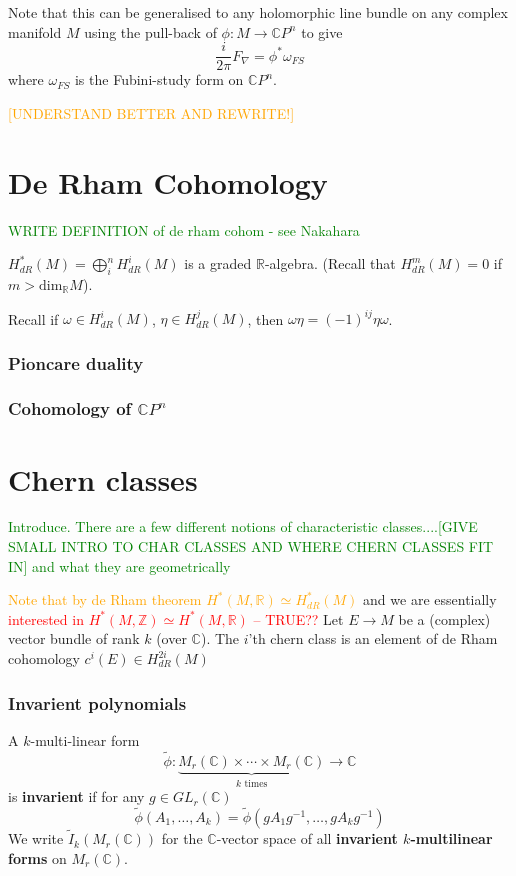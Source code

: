 \documentclass[a4paper]{article}
\theoremstyle{definition} \newtheorem*{definition}{Definition}
\theoremstyle{definition} \newtheorem*{definitions}{Definitions}
\theoremstyle{plain} \newtheorem{theorem}{Theorem}[section]
\theoremstyle{plain} \newtheorem{proposition}[theorem]{Proposition}
\theoremstyle{plain} \newtheorem{corollary}[theorem]{Corollary}
\theoremstyle{plain} \newtheorem{lemma}[theorem]{Lemma}
\theoremstyle{plain} \newtheorem{example}[theorem]{Example}
\newcommand{\checkCorrect}[1]{\textcolor{red}{#1}}
\newcommand{\understandBetter}[1]{\textcolor{orange}{#1}}
\newcommand{\finish}[1]{\textcolor{green}{#1}}
\newcommand{\defn}[1]{\textbf{#1}}
\newcommand{\realnos}{\mathbb{R}}
\newcommand{\complexnos}{\mathbb{C}}
\begin{document}
Note that this can be generalised to any holomorphic line bundle on any complex manifold $M$ using the pull-back of $\phi:M\to \complexnos P^n$ to give
$$\frac{i}{2\pi}F_\nabla = \phi^* \omega_{FS}$$
where $\omega_{FS}$ is the Fubini-study form on $\complexnos P^n$.

\understandBetter{[UNDERSTAND BETTER AND REWRITE!]}

\section{De Rham Cohomology}
\finish{WRITE DEFINITION of de rham cohom - see Nakahara}

$H^*_{dR}(M) = \bigoplus_i^n H^i_{dR}(M)$ is a graded $\realnos$-algebra. (Recall that $H^m_{dR}(M)=0$ if $m>\text{dim}_\realnos M$). 

Recall if $\omega \in H^{i}_{dR}(M)$, $\eta \in H^{j}_{dR}(M)$, then $\omega \eta = (-1)^{ij} \eta \omega$.

\subsubsection{Pioncare duality}

\subsubsection{Cohomology of $\complexnos P^n$}

\section{Chern classes}
\finish{Introduce. There are a few different notions of characteristic classes....[GIVE SMALL INTRO TO CHAR CLASSES AND WHERE CHERN CLASSES FIT IN] and what they are geometrically}

\understandBetter{Note that by de Rham theorem $H^*(M, \realnos)\simeq H^*_{dR}(M)$} and we are essentially \checkCorrect{interested in $H^*(M, \mathbb{Z})\simeq H^*(M, \realnos)$ -- TRUE??}
Let $E\to M$ be a (complex) vector bundle of rank $k$ (over $\complexnos$). The $i$'th chern class is an element of de Rham cohomology
$c^i(E)\in H^{2i}_{dR}(M)$

\subsubsection{Invarient polynomials}

A $k$-multi-linear form $$\tilde{\phi}:\underbrace{M_r(\complexnos)\times \cdots \times M_r(\complexnos)}_{k \text{ times}}\to \complexnos$$
is \defn{invarient} if for any $g\in GL_r(\complexnos)$
$$\tilde{\phi}(A_1, \ldots, A_k) = \tilde{\phi}(gA_1g^{-1}, \ldots, gA_kg^{-1})$$
We write $\tilde{I}_k(M_r(\complexnos))$ for the $\complexnos$-vector space of all \defn{invarient $k$-multilinear forms} on $M_r(\complexnos)$. 
\end{document}
